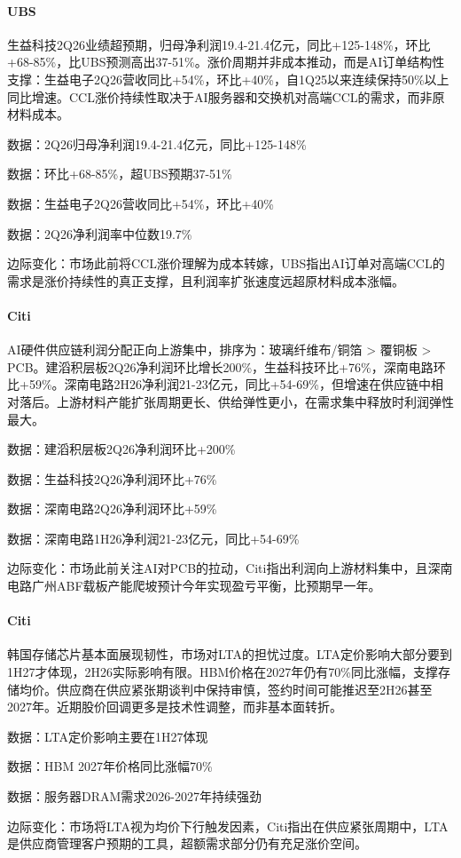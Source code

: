 \documentclass[11pt]{ctexart}
\begin{document}
\paragraph{UBS} 生益科技2Q26业绩超预期，归母净利润19.4-21.4亿元，同比+125-148\%，环比+68-85\%，比UBS预测高出37-51\%。涨价周期并非成本推动，而是AI订单结构性支撑：生益电子2Q26营收同比+54\%，环比+40\%，自1Q25以来连续保持50\%以上同比增速。CCL涨价持续性取决于AI服务器和交换机对高端CCL的需求，而非原材料成本。
{\small\color{refgray}数据：2Q26归母净利润19.4-21.4亿元，同比+125-148\%\par}
{\small\color{refgray}数据：环比+68-85\%，超UBS预期37-51\%\par}
{\small\color{refgray}数据：生益电子2Q26营收同比+54\%，环比+40\%\par}
{\small\color{refgray}数据：2Q26净利润率中位数19.7\%\par}
{\small\color{refgray}边际变化：市场此前将CCL涨价理解为成本转嫁，UBS指出AI订单对高端CCL的需求是涨价持续性的真正支撑，且利润率扩张速度远超原材料成本涨幅。\par}
\paragraph{Citi} AI硬件供应链利润分配正向上游集中，排序为：玻璃纤维布/铜箔 > 覆铜板 > PCB。建滔积层板2Q26净利润环比增长200\%，生益科技环比+76\%，深南电路环比+59\%。深南电路2H26净利润21-23亿元，同比+54-69\%，但增速在供应链中相对落后。上游材料产能扩张周期更长、供给弹性更小，在需求集中释放时利润弹性最大。
{\small\color{refgray}数据：建滔积层板2Q26净利润环比+200\%\par}
{\small\color{refgray}数据：生益科技2Q26净利润环比+76\%\par}
{\small\color{refgray}数据：深南电路2Q26净利润环比+59\%\par}
{\small\color{refgray}数据：深南电路1H26净利润21-23亿元，同比+54-69\%\par}
{\small\color{refgray}边际变化：市场此前关注AI对PCB的拉动，Citi指出利润向上游材料集中，且深南电路广州ABF载板产能爬坡预计今年实现盈亏平衡，比预期早一年。\par}
\paragraph{Citi} 韩国存储芯片基本面展现韧性，市场对LTA的担忧过度。LTA定价影响大部分要到1H27才体现，2H26实际影响有限。HBM价格在2027年仍有70\%同比涨幅，支撑存储均价。供应商在供应紧张期谈判中保持审慎，签约时间可能推迟至2H26甚至2027年。近期股价回调更多是技术性调整，而非基本面转折。
{\small\color{refgray}数据：LTA定价影响主要在1H27体现\par}
{\small\color{refgray}数据：HBM 2027年价格同比涨幅70\%\par}
{\small\color{refgray}数据：服务器DRAM需求2026-2027年持续强劲\par}
{\small\color{refgray}边际变化：市场将LTA视为均价下行触发因素，Citi指出在供应紧张周期中，LTA是供应商管理客户预期的工具，超额需求部分仍有充足涨价空间。\par}
\end{document}
